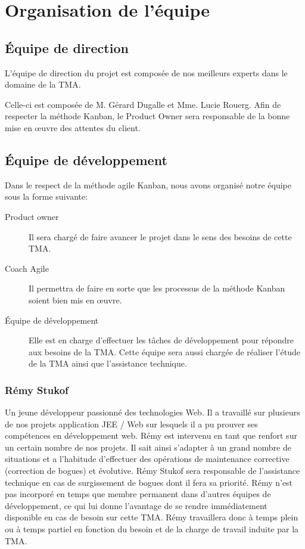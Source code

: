 \section{Organisation de l'équipe}
	\subsection{Équipe de direction}
	L’équipe de direction du projet est composée de nos meilleurs experts dans le domaine de la TMA. 

	Celle-ci est composée de M. Gérard Dugalle et Mme. Lucie Rouerg. Afin de respecter la méthode Kanban, le Product Owner sera responsable de la bonne mise en œuvre des attentes du client.
	
	\subsection{Équipe de développement}
	Dans le respect de la méthode agile Kanban, nous avons organisé notre équipe sous la forme suivante:
	
	\begin{description}
		\item[Product owner]  Il sera chargé de faire avancer le projet dans le sens des besoins de cette TMA.
		\item[Coach Agile]  Il permettra de faire en sorte que les processus de la méthode Kanban soient bien mis en œuvre. 
		\item[Équipe de développement] Elle est en charge d’effectuer les tâches de développement pour répondre aux besoins de la TMA. Cette équipe sera aussi chargée de réaliser l’étude de la TMA ainsi que l’assistance technique. 		
	\end{description}
		
\subsubsection{Rémy Stukof}
Un jeune développeur passionné des technologies Web. Il a travaillé sur plusieurs de nos projets application JEE / Web sur lesquels il a pu prouver ses compétences en développement web. Rémy est intervenu en tant que renfort sur un certain nombre de nos projets. Il sait ainsi s’adapter à un grand nombre de situations et a l’habitude d’effectuer des opérations de maintenance corrective (correction de bogues) et évolutive. Rémy Stukof sera responsable de l’assistance technique en cas de surgissement de bogues dont il fera sa priorité. Rémy n’est pas incorporé en temps que membre permanent dans d’autres équipes de développement, ce qui lui donne l’avantage de se rendre immédiatement disponible en cas de besoin sur cette TMA. Rémy travaillera donc à temps plein ou à temps partiel en fonction du besoin et de la charge de travail induite par la TMA. 

